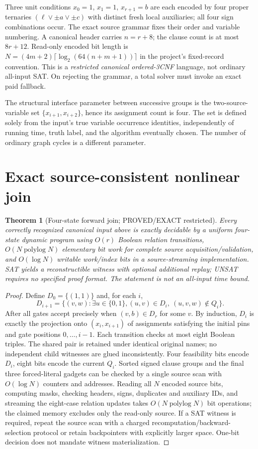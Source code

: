 \documentclass[11pt]{article}
\newtheorem{theorem}{Theorem}
\begin{document}
Three unit conditions $x_0=1$, $x_1=1$, $x_{r+1}=b$ are each encoded by four proper ternaries $(\ell\vee \pm a\vee\pm c)$ with distinct fresh local auxiliaries; all four sign combinations occur. The exact source grammar fixes their order and variable numbering. A canonical header carries $n=r+8$; the clause count is at most $8r+12$. Read-only encoded bit length is $N=(4m+2)\lceil\log_2(64(n+m+1))\rceil$ in the project's fixed-record convention. This is a \emph{restricted canonical ordered-3CNF} language, not ordinary all-input SAT. On rejecting the grammar, a total solver must invoke an exact paid fallback.

The structural interface parameter between successive groups is the two-source-variable set $\{x_{i+1},x_{i+2}\}$, hence its assignment count is four. The set is defined solely from the input's true variable occurrence identities, independently of running time, truth label, and the algorithm eventually chosen. The number of ordinary graph cycles is a different parameter.

\section{Exact source-consistent nonlinear join}
\begin{theorem}[Four-state forward join; PROVED/EXACT restricted]
Every correctly recognized canonical input above is exactly decidable by a uniform four-state dynamic program using $O(r)$ Boolean relation transitions, $O(N\operatorname{polylog}N)$ elementary bit work for complete source acquisition/validation, and $O(\log N)$ writable work/index bits in a source-streaming implementation. SAT yields a reconstructible witness with optional additional replay; UNSAT requires no specified proof format. The statement is \emph{not} an all-input time bound.
\end{theorem}
\begin{proof}
Define $D_0=\{(1,1)\}$ and, for each $i$,
\[
 D_{i+1}=\{(v,w):\exists u\in\{0,1\},
      (u,v)\in D_i,\ (u,v,w)\notin Q_i\}.
\]
After all gates accept precisely when $(v,b)\in D_r$ for some $v$. By induction, $D_i$ is exactly the projection onto $(x_i,x_{i+1})$ of assignments satisfying the initial pins and gate positions $0,\ldots,i-1$. Each transition checks at most eight Boolean triples. The shared pair is retained under identical original names; no independent child witnesses are glued inconsistently. Four feasibility bits encode $D_i$, eight bits encode the current $Q_i$. Sorted signed clause groups and the final three forced-literal gadgets can be checked by a single source scan with $O(\log N)$ counters and addresses. Reading all $N$ encoded source bits, computing masks, checking headers, signs, duplicates and auxiliary IDs, and streaming the eight-case relation updates takes $O(N\operatorname{polylog}N)$ bit operations; the claimed memory excludes only the read-only source. If a SAT witness is required, repeat the source scan with a charged recomputation/backward-selection protocol or retain backpointers with explicitly larger space. One-bit decision does not mandate witness materialization.
\end{proof}
\end{document}
